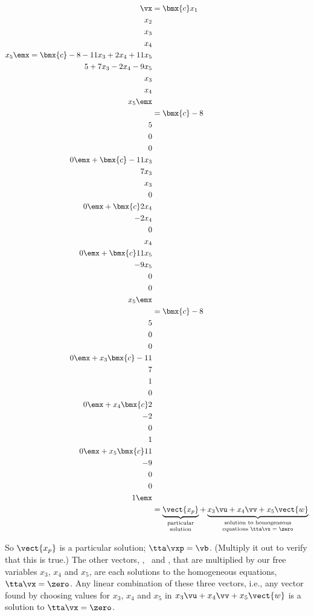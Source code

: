 {\begin{align*}
\vx &= \bmx{c}x_1\\x_2\\x_3\\x_4\\x_5\emx = \bmx{c}-8-11x_3+2x_4+11x_5\\5+7x_3-2x_4-9x_5\\x_3\\x_4\\x_5\emx\\
    &= \bmx{c}-8\\5\\0\\0\\0\emx + \bmx{c}-11x_3\\7x_3\\x_3\\0\\0\emx+ \bmx{c}2x_4\\-2x_4\\0\\x_4\\0\emx + \bmx{c}11x_5\\-9x_5\\0\\0\\x_5\emx \\
    &= \bmx{c}-8\\5\\0\\0\\0\emx + x_3\bmx{c}-11\\7\\1\\0\\0\emx+ x_4\bmx{c}2\\-2\\0\\1\\0\emx + x_5\bmx{c}11\\-9\\0\\0\\1\emx \\
    &= \underbrace{\vect{x_p}}_{\parbox{35pt}{\center \scriptsize {\vskip -10pt} particular solution}}+ \underbrace{x_3\vu+x_4\vv+x_5\vect{w}}_{\parbox{100pt}{\center \scriptsize {\vskip -10pt} solution to homogeneous equations $\tta\vx=\zero$}}
\end{align*}


So $\vect{x_p}$ is a particular solution; $\tta\vxp = \vb$. (Multiply it out to verify that this is true.) The other vectors, \vu, \vv\ and , that are multiplied by our free variables $x_3$, $x_4$ and $x_5$, are each solutions to the homogeneous equations, $\tta\vx=\zero$. Any linear combination of these three vectors, i.e., any vector found by choosing values for $x_3$, $x_4$ and $x_5$ in $x_3\vu+x_4\vv+x_5\vect{w}$ is a solution to $\tta\vx=\zero$.}

